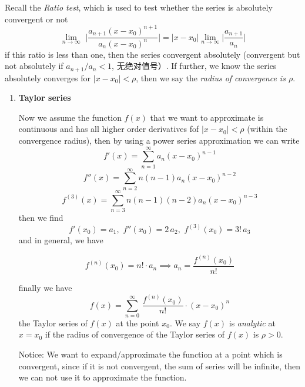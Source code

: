 \documentclass[10pt]{article}
\newenvironment{changemargin}[2]{%
  \begin{list}{}{%
    \setlength{\topsep}{0pt}%
    \setlength{\leftmargin}{#1}%
    \setlength{\rightmargin}{#2}%
    \setlength{\listparindent}{\parindent}%
    \setlength{\itemindent}{\parindent}%
    \setlength{\parsep}{\parskip}%
  }%
  \item[]}{\end{list}}
\begin{document}
\begin{changemargin}{-0.125in}{0in}
\begin{enumerate}
      \medskip
      
      Recall the \textit{Ratio test}, which is used to test whether the series is absolutely convergent or not 
      \[
      \lim_{n\rightarrow\infty}\,\, \bigg| \frac{a_{n+1} (x - x_0)^{n+1}}{a_n (x-x_0)^n} \bigg| = \big|x-x_0\big| \lim_{n \rightarrow \infty}\bigg|\frac{a_{n+1}}{a_n}\bigg|
      \]
	  if this ratio is less than one, then the series convergent absolutely (convergent but not absolutely if $a_{n+1}/a_n<1$, 无绝对值号）. If further, we know the series absolutely converges for $|x - x_0|< \rho$, then we say the \textit{radius of convergence is $\rho$}.
	  
	  \medskip
	  
	  \begin{enumerate}
	  
	  \item \textbf{Taylor series}
	  
	  \smallskip
	  
	  Now we assume the function $f(x)$ that we want to approximate is continuous and has all higher order derivatives fof $|x - x_0| < \rho$ (within the convergence radius), then by using a power series approximation we can write 
	  \[
	  f'(x) = \sum_{n = 1}^\infty a_n(x - x_0)^{n-1}
	  \]
	  \[
	  f''(x) = \sum_{n = 2}^\infty n(n-1)a_n(x - x_0)^{n-2}
	  \]
	  \[
	  f^{(3)}(x) = \sum_{n=3}^\infty n(n-1)(n-2) a_n(x - x_0)^{n-3}
	  \]
	  then we find 
	  \[
	  f'(x_0) = a_1,\,\,f''(x_0) = 2\,a_2,\,\,f^{(3)}(x_0) = 3!\,a_3
	  \]
	  and in general, we have 
	  
	  \begin{tcolorbox}[notitle,boxrule=0pt,colback=blue!20,colframe=blue!20]
	  \[
	  f^{(n)}(x_0) = n! \cdot a_n \implies a_n = \frac{f^{(n)}(x_0)}{n!}
	  \]
	  \end{tcolorbox}
	  finally we have 
	  \[
	  f(x) = \sum_{n = 0}^\infty \,\frac{f^{(n)}(x_0)}{n!} \cdot (x - x_0)^n
	  \]
	  the Taylor series of $f(x)$ at the point $x_0$. We say $f(x)$ is \textit{analytic} at $x = x_0$ if the radius of convergence of the Taylor series of $f(x)$ is $\rho > 0$.
	  
	  \smallskip
	  
	   \begin{tcolorbox}[notitle,boxrule=0pt,colback=orange!20,colframe=blue!20]
	   Notice: We want to expand/approximate the function at a point which is convergent, since if it is not convergent, the sum of series will be infinite, then we can not use it to approximate the function.
	   \end{tcolorbox}
	   

\end{enumerate}
\end{enumerate}
\end{changemargin}
\end{document}
